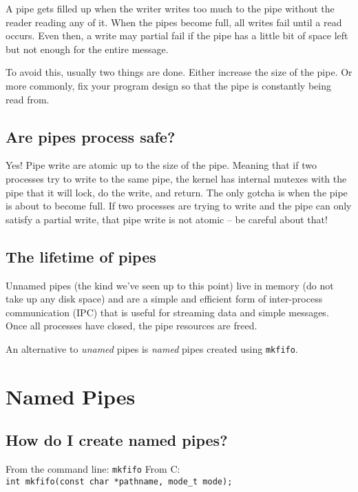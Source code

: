 A pipe gets filled up when the writer writes too much to the pipe
without the reader reading any of it. When the pipes become full, all
writes fail until a read occurs. Even then, a write may partial fail if
the pipe has a little bit of space left but not enough for the entire
message.

To avoid this, usually two things are done. Either increase the size of
the pipe. Or more commonly, fix your program design so that the pipe is
constantly being read from.

\subsection{Are pipes process safe?}\label{are-pipes-process-safe}

Yes! Pipe write are atomic up to the size of the pipe. Meaning that if
two processes try to write to the same pipe, the kernel has internal
mutexes with the pipe that it will lock, do the write, and return. The
only gotcha is when the pipe is about to become full. If two processes
are trying to write and the pipe can only satisfy a partial write, that
pipe write is not atomic -- be careful about that!

\subsection{The lifetime of pipes}\label{the-lifetime-of-pipes}

Unnamed pipes (the kind we've seen up to this point) live in memory (do
not take up any disk space) and are a simple and efficient form of
inter-process communication (IPC) that is useful for streaming data and
simple messages. Once all processes have closed, the pipe resources are
freed.

An alternative to \emph{unamed} pipes is \emph{named} pipes created
using \texttt{mkfifo}.

\section{Named Pipes}\label{named-pipes}

\subsection{How do I create named
pipes?}\label{how-do-i-create-named-pipes}

From the command line: \texttt{mkfifo} From C:
\texttt{int\ mkfifo(const\ char\ *pathname,\ mode\_t\ mode);}

